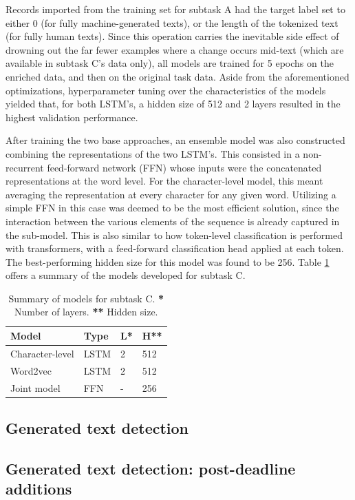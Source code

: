 Records imported from the training set for subtask A had the target label set to either 0 (for fully machine-generated texts), or the length of the tokenized text (for fully human texts).
Since this operation carries the inevitable side effect of drowning out the far fewer examples where a change occurs mid-text (which are available in subtask C's data only), all models are trained for 5 epochs on the enriched data, and then on the original task data.
Aside from the aforementioned optimizations, hyperparameter tuning over the characteristics of the models yielded that, for both LSTM's, a hidden size of 512 and 2 layers resulted in the highest validation performance.

After training the two base approaches, an ensemble model was also constructed combining the representations of the two LSTM's.
This consisted in a non-recurrent feed-forward network (FFN) whose inputs were the concatenated representations at the word level.
For the character-level model, this meant averaging the representation at every character for any given word.
Utilizing a simple FFN in this case was deemed to be the most efficient solution, since the interaction between the various elements of the sequence is already captured in the sub-model.
This is also similar to how token-level classification is performed with transformers, with a feed-forward classification head applied at each token.
The best-performing hidden size for this model was found to be 256.
Table \ref{tab:c_models} offers a summary of the models developed for subtask C.

\begin{table}[h]
    \centering
    \begin{tabular}{llll}
        \hline
        \textbf{Model}  & \textbf{Type} & \textbf{L*} & \textbf{H**} \\
        \hline
        Character-level & LSTM          & 2           & 512          \\
        Word2vec        & LSTM          & 2           & 512          \\
        Joint model     & FFN           & -           & 256          \\
        \hline
    \end{tabular}
    \caption{Summary of models for subtask C. \textbf{*} Number of layers. \textbf{**} Hidden size.}
    \label{tab:c_models}
\end{table}


\subsection{Generated text detection}
\label{subsec:subtask_a}

\subsection{Generated text detection: post-deadline additions}